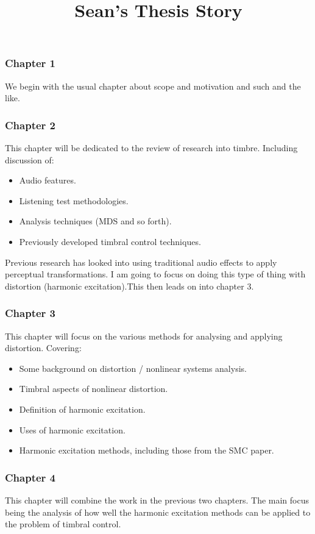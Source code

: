 \documentclass[a4paper]{article}
\title{Sean's Thesis Story}
\author{}
\date{}
\begin{document}
\maketitle
	
	\subsubsection*{Chapter 1}
	We begin with the usual chapter about scope and motivation and such and the like.

	\subsubsection*{Chapter 2}
	This chapter will be dedicated to the review of research into timbre. Including discussion of:

		\begin{itemize}
			\item Audio features.
			\item Listening test methodologies.
			\item Analysis techniques (MDS and so forth).
			\item Previously developed timbral control techniques.
		\end{itemize}

		Previous research has looked into using traditional audio effects to apply perceptual transformations. I am going to focus on doing this type of thing with distortion (harmonic excitation).This then leads on into chapter 3.

	\subsubsection*{Chapter 3}
	This chapter will focus on the various methods for analysing and applying distortion. Covering:

		\begin{itemize}
			\item Some background on distortion / nonlinear systems analysis.
			\item Timbral aspects of nonlinear distortion.
			\item Definition of harmonic excitation.
			\item Uses of harmonic excitation.
			\item Harmonic excitation methods, including those from the SMC paper.
		\end{itemize}

	\subsubsection*{Chapter 4}
	This chapter will combine the work in the previous two chapters. The main focus being the analysis of how well the harmonic excitation methods can be applied to the problem of timbral control. 
	
\end{document}
